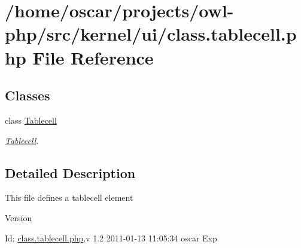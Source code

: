 \section{/home/oscar/projects/owl-\/php/src/kernel/ui/class.tablecell.php File Reference}
\label{class_8tablecell_8php}
\subsection*{Classes}
\begin{DoxyCompactItemize}
\item 
class \hyperlink{classTablecell}{Tablecell}
\begin{DoxyCompactList}\small\item\em \hyperlink{classTablecell}{Tablecell}. \item\end{DoxyCompactList}\end{DoxyCompactItemize}


\subsection{Detailed Description}
This file defines a tablecell element \begin{DoxyVersion}{Version}

\end{DoxyVersion}
\begin{DoxyParagraph}{Id:}
\hyperlink{class_8tablecell_8php}{class.tablecell.php},v 1.2 2011-\/01-\/13 11:05:34 oscar Exp 
\end{DoxyParagraph}
